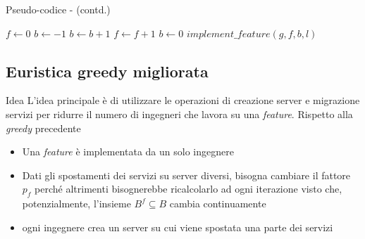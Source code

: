 \documentclass{beamer}
\begin{document}
\begin{frame}{Pseudo-codice - (contd.)}
\begin{algorithm}[H]
\begin{algorithmic}[1]
\State $f \gets 0$
\State $b \gets -1$
            \State $b \gets b + 1$
                \State $f \gets f+1$
                \State $b \gets 0$
            \EndIf
            \State $implement\_feature(g, f, b, l)$
        \EndIf
    \EndFor
\EndFor

\end{algorithmic}
\end{algorithm}
\end{frame}


\subsection{Euristica greedy migliorata}

\begin{frame}{Idea}
 L'idea principale è di utilizzare le operazioni di creazione server e migrazione servizi per ridurre il numero di ingegneri che lavora su una \textit{feature}.
 Rispetto alla \textit{greedy} precedente
\begin{itemize}
    \item Una \textit{feature} è implementata da un solo ingegnere
    \item Dati gli spostamenti dei servizi su server diversi, bisogna cambiare il fattore $p_f$ perché altrimenti bisognerebbe ricalcolarlo ad ogni iterazione visto che, potenzialmente, l'insieme $B^f \subseteq B$ cambia continuamente
    \item ogni ingegnere crea un server su cui viene spostata una parte dei servizi
\end{itemize}

\end{frame}
\end{document}
